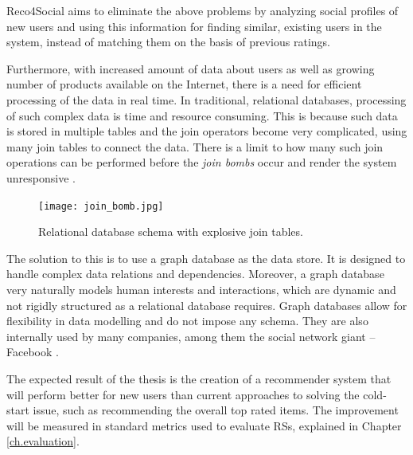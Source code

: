 \documentclass[12pt]{report}
\begin{document}
Reco4Social aims to eliminate the above problems by analyzing social profiles of new users and using this information for finding similar, existing users in the system, instead of matching them on the basis of previous ratings.

\hbox{}
Furthermore, with increased amount of data about users as well as growing number of products available on the Internet, there is a need for efficient processing of the data in real time. In traditional, relational databases, processing of such complex data is time and resource consuming. This is because such data is stored in multiple tables and the join operators become very complicated, using many join tables to connect the data. There is a limit to how many such join operations can be performed before the \textit{join bombs} occur and render the system unresponsive \cite{learning_neo4j}.

\begin{figure}[!h]
\centering
\texttt{[image: join\_bomb.jpg]} 
\caption[Relational database schema with explosive join tables.]{Relational database schema with explosive join tables.\footnotemark{}}
\label{fig.join_bomb}
\end{figure}

The solution to this is to use a graph database as the data store. It is designed to handle complex data relations and dependencies. Moreover, a graph database very naturally models human interests and interactions, which are dynamic and not rigidly structured as a relational database requires. Graph databases allow for flexibility in data modelling and do not impose any schema. They are also internally used by many companies, among them the social network giant -- Facebook \cite{facebook_social_graph}. 




\hbox{}
The expected result of the thesis is the creation of a recommender system that will perform better for new users than current approaches to solving the cold-start issue, such as recommending the overall top rated items. The improvement will be measured in standard metrics used to evaluate RSs, explained in Chapter \ref{ch.evaluation}. 
\end{document}
